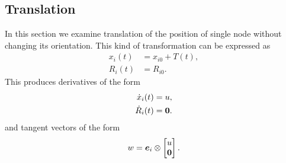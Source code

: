 \documentclass[12pt]{article}
\newcommand{\dx}{\dot{x}}
\newcommand{\kron}{\otimes}
\begin{document}




\subsection{Translation}
In this section we examine translation of the position of single node without changing its orientation. This kind of transformation can be expressed as
\begin{align}
\label{eq:singleTranslation}
  x_i(t)&=x_{i0}+T(t),  \\
  R_i(t)&= R_{i0}.
\end{align}
This produces derivatives of the form
\begin{align}
\label{eq:derSingleTranslation}
  \dx_i(t)&=u,  \\
  \dR_i(t)&=\vct{0}.
\end{align}
and tangent vectors of the form
\begin{equation}
  \label{eq:tangentVectorTranslation}
  w=\vct{e}_i \kron \bmat{u\\\vct{0}}.
\end{equation}
\end{document}
